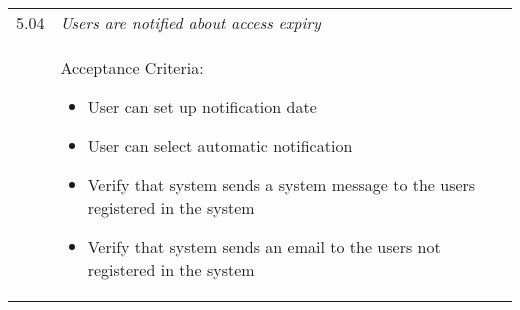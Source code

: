 \begin{table}[htb]
\begin{center}
\begin{tabular}{|l p{12cm}|}
     5.04 & \textit{Users are notified about access expiry} \\ 
         & Acceptance Criteria:  
	       \begin{itemize}[nosep,label=--]
	         \item User can set up notification date
	         \item User can select automatic notification
	         \item Verify that system sends a system message to the users
	         registered in the system
		     \item Verify that system sends an email to the users not registered in
		     the system 
		   \end{itemize} \\ \hline
    \end{tabular}
    \label{tab:req5}
\end{center}
\end{table}